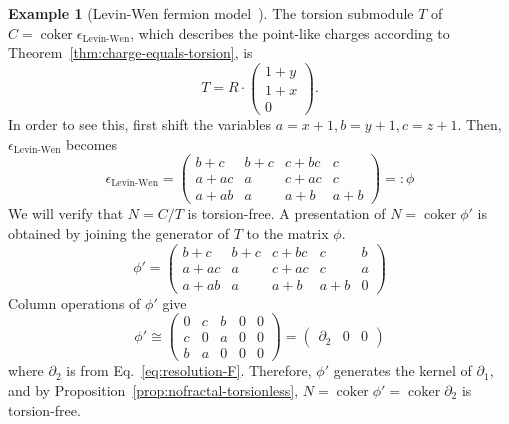 \documentclass[letterpaper,12pt]{amsart}
\theoremstyle{definition} \newtheorem{defn}{Definition}
\theoremstyle{definition} \newtheorem{rem}{Remark}
\theoremstyle{definition} \newtheorem{example}{Example}
\newcommand{\coker}{\mathop{\mathrm{coker}}}
\begin{document}
\begin{example}[Levin-Wen fermion model~\cite{LevinWen2003Fermions}]
The torsion submodule $T$ of $C = \coker \epsilon_\text{Levin-Wen}$,
which describes the point-like charges according to Theorem~\ref{thm:charge-equals-torsion},
is
\begin{equation}
 T = R \cdot \begin{pmatrix} 1+y \\ 1+x \\ 0 \end{pmatrix} .
\label{eq:Levin-Wen-torsion}
\end{equation}
In order to see this, first shift the variables $a = x+1, b=y+1, c=z+1$.
Then, $\epsilon_\text{Levin-Wen}$ becomes
\[
\epsilon_\text{Levin-Wen} =
\begin{pmatrix}
 b+c & b+c & c+b c & c \\
 a+a c & a & c+a c & c \\
 a+a b & a & a+b & a+b
\end{pmatrix}
 =: \phi
\]
We will verify that $N = C / T$ is torsion-free.
A presentation of $N = \coker \phi'$ is obtained by joining the generator of $T$ to the matrix $\phi$.
\[
 \phi' = 
\begin{pmatrix}
 b+c & b+c & c+b c & c & b \\
 a+a c & a & c+a c & c & a \\
 a+a b & a & a+b & a+b & 0
\end{pmatrix}
\]
Column operations of $\phi'$ give
\[
 \phi' \cong
\begin{pmatrix}
 0 & c & b & 0 & 0 \\
 c & 0 & a & 0 & 0 \\
 b & a & 0 & 0 & 0
\end{pmatrix} = 
\begin{pmatrix}
 \partial_2 & 0 & 0
\end{pmatrix}
\]
where $\partial_2$ is from Eq.~\eqref{eq:resolution-F}.
Therefore, $\phi'$ generates the kernel of $\partial_1$,
and by Proposition~\ref{prop:nofractal-torsionless}, $N = \coker \phi'= \coker \partial_2$ is torsion-free.


\end{example}
\end{document}
